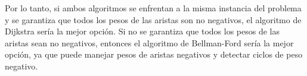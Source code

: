\begin{problema}
\begin{sol}
Por lo tanto, si ambos algoritmos se enfrentan a la misma instancia del problema y se garantiza que todos los pesos de las aristas son no negativos, el algoritmo de Dijkstra sería la mejor opción. Si no se garantiza que todos los pesos de las aristas sean no negativos, entonces el algoritmo de Bellman-Ford sería la mejor opción, ya que puede manejar pesos de aristas negativos y detectar ciclos de peso negativo.
    \end{sol}
\end{problema}



%
%

